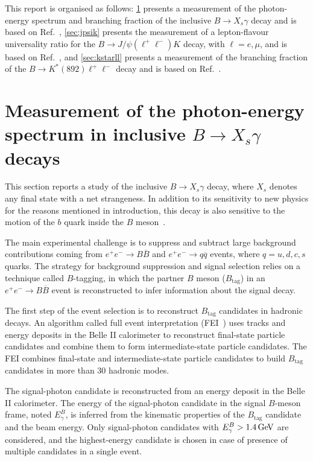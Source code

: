 \documentclass{moriond}
\def\gev{\ensuremath{\mathrm{\,Ge\kern -0.1em V}}\xspace}
\def\epem{\ensuremath{e^+e^-}\xspace}
\def\BB{\ensuremath{B\overline{B}}\xspace}
\def\Btag{\ensuremath{B_{\mathrm{tag}}}\xspace}
\begin{document}
This report is organised as follows: 
\cref{sec:xsgamma} presents a measurement of the photon-energy spectrum and branching fraction of the inclusive $B \to X_s\gamma$ decay and is based on Ref.~\cite{Belle-II:2022hys},
\cref{sec:jpsik} presents the measurement of a lepton-flavour universality ratio for the $B \to J/\psi (\ell^+\ell^-) K$ decay, with $\ell=e,\mu$, and is based on Ref.~\cite{Belle-II:2022dbo},
and \cref{sec:kstarll} presents a measurement of the branching fraction of the $B \to K^{\ast}(892)\ell^+\ell^-$ decay and is based on Ref.~\cite{Belle-II:2022fky}.
\section{Measurement of the photon-energy spectrum in inclusive $B \to X_s\gamma$ decays}\label{sec:xsgamma}

This section reports a study of the inclusive $B \to X_s\gamma$ decay, where $X_s$ denotes any final state with a net strangeness.
In addition to its sensitivity to new physics for the reasons mentioned in introduction, this decay is also sensitive to the motion of the $b$ quark inside the $B$ meson~\cite{Bernlochner:2020jlt}.

The main experimental challenge is to suppress and subtract large background contributions coming from $\epem\to\BB$ and $\epem\to q\overline{q}$ events, where $q=u,d,c,s$ quarks.
The strategy for background suppression and signal selection relies on a technique called $B$-tagging, in which the partner $B$ meson (\Btag) in an $\epem\to\BB$ event is reconstructed to infer information about the signal decay.

The first step of the event selection is to reconstruct \Btag candidates in hadronic decays.
An algorithm called full event interpretation (FEI~\cite{Keck:2018lcd}) uses tracks and energy deposits in the Belle II calorimeter to reconstruct final-state particle candidates and combine them to form intermediate-state particle candidates.
The FEI combines final-state and intermediate-state particle candidates to build \Btag candidates in more than 30 hadronic modes.

The signal-photon candidate is reconstructed from an energy deposit in the Belle II calorimeter.
The energy of the signal-photon candidate in the signal $B$-meson frame, noted $E_\gamma^B$, is inferred from the kinematic properties of the \Btag candidate and the beam energy.
Only signal-photon candidates with $E_\gamma^B>1.4\gev$ are considered, and the highest-energy candidate is chosen in case of presence of multiple candidates in a single event.
\end{document}
